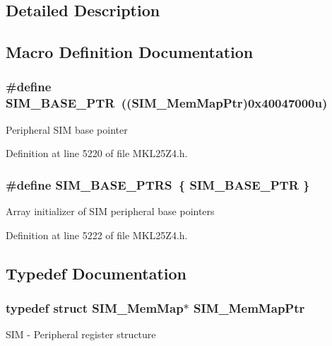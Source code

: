 \subsection{Detailed Description}


\subsection{Macro Definition Documentation}
\subsubsection[{\texorpdfstring{S\+I\+M\+\_\+\+B\+A\+S\+E\+\_\+\+P\+TR}{SIM_BASE_PTR}}]{\setlength{\rightskip}{0pt plus 5cm}\#define S\+I\+M\+\_\+\+B\+A\+S\+E\+\_\+\+P\+TR~(({\bf S\+I\+M\+\_\+\+Mem\+Map\+Ptr})0x40047000u)}\hypertarget{group___s_i_m___peripheral_ga719ec5df95fbb5732438f794f2cccf3c}{}\label{group___s_i_m___peripheral_ga719ec5df95fbb5732438f794f2cccf3c}
Peripheral S\+IM base pointer 

Definition at line 5220 of file M\+K\+L25\+Z4.\+h.

\subsubsection[{\texorpdfstring{S\+I\+M\+\_\+\+B\+A\+S\+E\+\_\+\+P\+T\+RS}{SIM_BASE_PTRS}}]{\setlength{\rightskip}{0pt plus 5cm}\#define S\+I\+M\+\_\+\+B\+A\+S\+E\+\_\+\+P\+T\+RS~\{ {\bf S\+I\+M\+\_\+\+B\+A\+S\+E\+\_\+\+P\+TR} \}}\hypertarget{group___s_i_m___peripheral_ga2fd213a3b9fc7d761ab0cdeb74c34f91}{}\label{group___s_i_m___peripheral_ga2fd213a3b9fc7d761ab0cdeb74c34f91}
Array initializer of S\+IM peripheral base pointers 

Definition at line 5222 of file M\+K\+L25\+Z4.\+h.



\subsection{Typedef Documentation}
\subsubsection[{\texorpdfstring{S\+I\+M\+\_\+\+Mem\+Map\+Ptr}{SIM_MemMapPtr}}]{\setlength{\rightskip}{0pt plus 5cm}typedef struct {\bf S\+I\+M\+\_\+\+Mem\+Map}$\ast$ {\bf S\+I\+M\+\_\+\+Mem\+Map\+Ptr}}\hypertarget{group___s_i_m___peripheral_ga708a122e8ca55082e0cf67cab6a77d02}{}\label{group___s_i_m___peripheral_ga708a122e8ca55082e0cf67cab6a77d02}
S\+IM -\/ Peripheral register structure 
